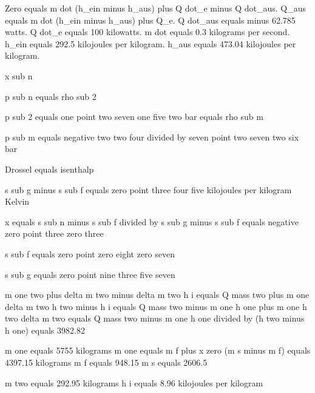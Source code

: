 Zero equals m dot (h_ein minus h_aus) plus Q dot_e minus Q dot_aus. Q_aus equals m dot (h_ein minus h_aus) plus Q_e. Q dot_aus equals minus 62.785 watts. Q dot_e equals 100 kilowatts. m dot equals 0.3 kilograms per second. h_ein equals 292.5 kilojoules per kilogram. h_aus equals 473.04 kilojoules per kilogram.

x sub n  

p sub n equals rho sub 2  

p sub 2 equals one point two seven one five two bar equals rho sub m  

p sub m equals negative two two four divided by seven point two seven two six bar  

Drossel equals isenthalp  

s sub g minus s sub f equals zero point three four five kilojoules per kilogram Kelvin  

x equals s sub n minus s sub f divided by s sub g minus s sub f equals negative zero point three zero three  

s sub f equals zero point zero eight zero seven  

s sub g equals zero point nine three five seven

m one two plus delta m two minus delta m two h i equals Q mass two plus m one
delta m two h two minus h i equals Q mass two minus m one h one plus m one h two
delta m two equals Q mass two minus m one h one divided by (h two minus h one) equals 3982.82

m one equals 5755 kilograms
m one equals m f plus x zero (m s minus m f) equals 4397.15 kilograms
m f equals 948.15
m s equals 2606.5

m two equals 292.95 kilograms
h i equals 8.96 kilojoules per kilogram